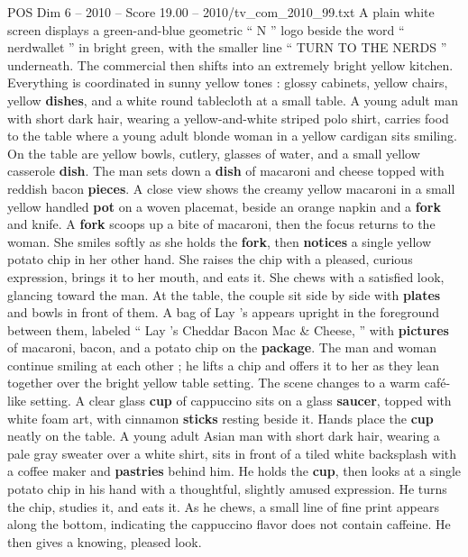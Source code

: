 \begin{textsample}{POS Dim 6 – 2010 – Score 19.00 – 2010/tv\_com\_2010\_99.txt}  \label{ex:f6_pos_081}
A plain white screen displays a green-and-blue geometric “ N ” logo beside the word “ nerdwallet ” in bright green, with the smaller line “ TURN TO THE NERDS ” underneath.
The commercial then shifts into an extremely bright yellow kitchen.
Everything is coordinated in sunny yellow tones : glossy cabinets, yellow chairs, yellow \textbf{dishes}, and a white round tablecloth at a small table.
A young adult man with short dark hair, wearing a yellow-and-white striped polo shirt, carries food to the table where a young adult blonde woman in a yellow cardigan sits smiling.
On the table are yellow bowls, cutlery, glasses of water, and a small yellow casserole \textbf{dish}.
The man sets down a \textbf{dish} of macaroni and cheese topped with reddish bacon \textbf{pieces}.
A close view shows the creamy yellow macaroni in a small yellow handled \textbf{pot} on a woven placemat, beside an orange napkin and a \textbf{fork} and knife.
A \textbf{fork} scoops up a bite of macaroni, then the focus returns to the woman.
She smiles softly as she holds the \textbf{fork}, then \textbf{notices} a single yellow potato chip in her other hand.
She raises the chip with a pleased, curious expression, brings it to her mouth, and eats it.
She chews with a satisfied look, glancing toward the man.
At the table, the couple sit side by side with \textbf{plates} and bowls in front of them.
A bag of Lay ’s appears upright in the foreground between them, labeled “ Lay ’s Cheddar Bacon Mac \& Cheese, ” with \textbf{pictures} of macaroni, bacon, and a potato chip on the \textbf{package}.
The man and woman continue smiling at each other ; he lifts a chip and offers it to her as they lean together over the bright yellow table setting.
The scene changes to a warm café-like setting.
A clear glass \textbf{cup} of cappuccino sits on a glass \textbf{saucer}, topped with white foam art, with cinnamon \textbf{sticks} resting beside it.
Hands place the \textbf{cup} neatly on the table.
A young adult Asian man with short dark hair, wearing a pale gray sweater over a white shirt, sits in front of a tiled white backsplash with a coffee maker and \textbf{pastries} behind him.
He holds the \textbf{cup}, then looks at a single potato chip in his hand with a thoughtful, slightly amused expression.
He turns the chip, studies it, and eats it.
As he chews, a small line of fine print appears along the bottom, indicating the cappuccino flavor does not contain caffeine.
He then gives a knowing, pleased look.

\end{textsample}
